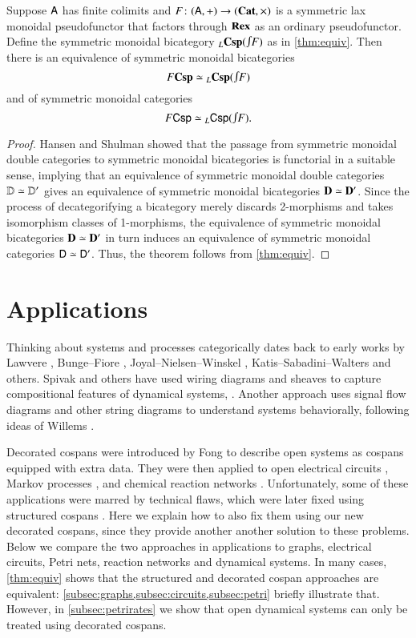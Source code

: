 \documentclass[reqno]{amsart}
\begin{document}
\begin{thm} \label{thm:bicat_equiv}
Suppose $\mathsf{A}$ has finite colimits and $F \colon(\mathsf{A},+) \to (\mathbf{Cat},\times)$ is a symmetric lax monoidal pseudofunctor that factors through $\mathbf{Rex}$ as an ordinary pseudofunctor.    Define the symmetric monoidal bicategory $_L\bCsp(\inta F)$ as in \cref{thm:equiv}.   Then there is an equivalence of symmetric monoidal bicategories
\[      F\bCsp \simeq {}_L \bCsp(\inta F)   \]
and of symmetric monoidal categories
\[      F\Csp \simeq {}_L \Csp(\inta F)  . \]
\end{thm}

\begin{proof} 
Hansen and Shulman \cite{HS} showed that the passage from symmetric monoidal double categories to symmetric monoidal bicategories is  functorial in a suitable sense, implying that an equivalence of symmetric monoidal double categories $\mathbf{\mathbb D} \simeq \mathbf{\mathbb D}'$ gives an equivalence of symmetric monoidal bicategories $\mathbf{D} \simeq \mathbf{D}'$.    Since the process of decategorifying a bicategory merely discards 2-morphisms and takes isomorphism classes of 1-morphisms, the equivalence of symmetric monoidal bicategories $\mathbf{D} \simeq \mathbf{D}'$ in turn induces an equivalence of symmetric monoidal categories $\mathsf{D} \simeq \mathsf{D}'$.   Thus, the theorem follows from \cref{thm:equiv}. \end{proof}

\section{Applications}\label{Applications}

Thinking about systems and processes categorically dates back to early works by Lawvere \cite{Lawvere}, Bunge--Fiore \cite{BungeFiore}, Joyal--Nielsen--Winskel \cite{JNW}, Katis--Sabadini--Walters \cite{KSW} and others.   Spivak and others have used wiring diagrams and sheaves to capture compositional features of dynamical systems, \cite{BFV,SSV,VSL}.  Another approach uses signal flow diagrams and other string diagrams \cite{BE,BSZ,FRS} to understand systems behaviorally, following ideas of Willems \cite{Willems}.  
 
Decorated cospans were introduced by Fong \cite{Fong,FongThesis} to describe open systems as cospans equipped with extra data.  They were then applied to open electrical circuits \cite{BF}, Markov processes \cite{BFP}, and chemical reaction networks \cite{BP}.  Unfortunately, some of these applications were marred by technical flaws, which were later fixed using structured cospans \cite{BC}. Here we explain how to also fix them using our new decorated cospans, since they provide another another solution to these problems. Below we compare the two approaches in applications to graphs, electrical circuits, Petri nets, reaction networks and dynamical systems. In many cases, \cref{thm:equiv} shows that the structured and decorated cospan approaches are equivalent: \cref{subsec:graphs,subsec:circuits,subsec:petri} briefly illustrate that. However, in \cref{subsec:petrirates} we show that open dynamical systems can only be treated using decorated cospans.
\end{document}
